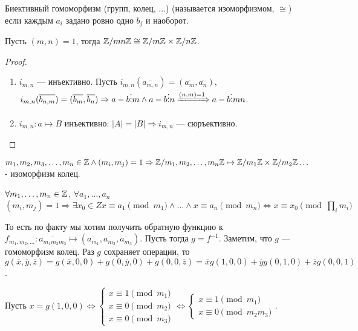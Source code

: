 \begin{definition}
    Биективный гомоморфизм (групп, колец, ...) (называется изоморфизмом, $\cong$) если каждым $a_i$ задано ровно одно  $b_j$ и наоборот.
\end{definition}
\begin{theorem}
    Пусть $(m, n)=1$, тогда $\mathbb{Z} / mn \mathbb{Z} \cong \mathbb{Z} / m\mathbb{Z} \times \mathbb{Z} / n \mathbb{Z}$.
\end{theorem}
\begin{proof}
    \slashn
    \begin{enumerate}
        \item $i_{m,n}$ --- инъективно. Пусть $i_{m,n}(\overline{a_{m,n}}) = (\overline{a_m}, \overline{a_n})$,  $i_{m,n}(\overline{b_{n, m}}) = (\overline{b_m}, \overline{b_n}) \Rightarrow  a-b \vdots m \land a-b\vdots n \xRightarrow{(n, m) = 1} a - b \vdots mn$.
        \item $i_{m, n}: a \mapsto B$ инъективно: $|A| = |B| \Rightarrow i_{m, n}$ --- сюръективно.  
    \end{enumerate}
\end{proof}
\begin{theorem}[КТО 2]
    $m_1,m_2,m_3,\ldots,m_n \in \mathbb{Z} \land (m_i, m_j) = 1 \Rightarrow \mathbb{Z} / m_1,m_2,\ldots,m_n \mathbb{Z} \mapsto \mathbb{Z} / m_1\mathbb{Z} \times \mathbb{Z} / m_2\mathbb{Z} \ldots$ - изоморфизм колец. 
\end{theorem}
\begin{theorem}
    $\forall m_1, \ldots, m_n \in \mathbb{Z}$, $\forall a_1, \ldots, a_n$ $(m_i, m_j) = 1 \Rightarrow \exists x_0 \in Z x \equiv a_1 \pmod{m_1} \land \ldots \land x \equiv a_n \pmod{m_n} \iff x \equiv x_0 \pmod {\prod_i m_i}$
\end{theorem}
\slashn
То есть по факту мы хотим получить обратную функцию к $f_{m_1,m_2,\ldots}: \overline{a_{m_1m_2m_3}} \mapsto (\overline{a_{m_1}}, \overline{a_{m_2}}, \overline{a_{m_3}})$. Пусть тогда $g=f^{-1}$. Заметим, что  $g$ --- гомоморфизм колец. Раз  $g$ сохраняет операции, то  $g(\overline{x}, \overline{y}, \overline{z}) = g(\overline{x}, 0, 0) + g(0, \overline{y}, 0) + g(0, 0, \overline{z}) = \overline{x}g(1, 0, 0) + \overline{y}g(0, 1, 0) + \overline{z}g(0, 0, 1)$.

Пусть  $x=g(1, 0, 0) \iff \begin{cases} x \equiv 1 \pmod{m_1} \\ x \equiv 0 \pmod{m_2} \\ x \equiv 0 \pmod{m_3} \end{cases} \iff \begin{cases} x \equiv 1 \pmod{m_1} \\ x \equiv 0 \pmod{m_2m_3} \end{cases}$.

